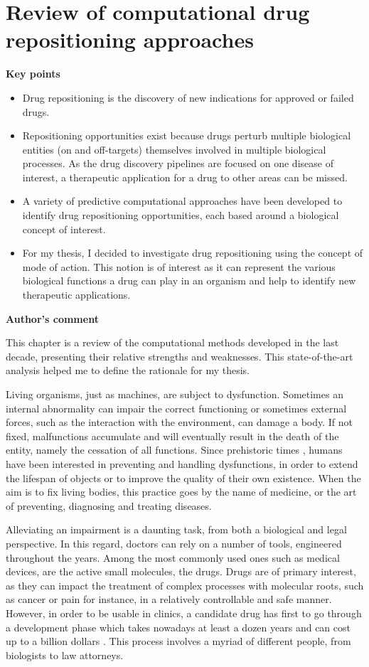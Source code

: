 \chapter{Review of computational drug repositioning approaches}

\textbf{Key points}
\begin{itemize}
  \item Drug repositioning is the discovery of new indications for approved or failed drugs.
  \item Repositioning opportunities exist because drugs perturb multiple biological entities (on and off-targets) themselves involved in multiple biological processes. As the drug discovery pipelines are focused on one disease of interest, a therapeutic application for a drug to other areas can be missed.
  \item A variety of predictive computational approaches have been developed to identify drug repositioning opportunities, each based around a biological concept of interest.
  \item For my thesis, I decided to investigate drug repositioning using the concept of mode of action. This notion is of interest as it can represent the various biological functions a drug can play in an organism and help to identify new therapeutic applications.
\end{itemize}

\textbf{Author’s comment}

This chapter is a review of the computational methods developed in the last decade, presenting their relative strengths and weaknesses. This state-of-the-art analysis helped me to define the rationale for my thesis.

Living organisms, just as machines, are subject to dysfunction. Sometimes an internal abnormality can impair the correct functioning or sometimes external forces, such as the interaction with the environment, can damage a body. If not fixed, malfunctions accumulate and will eventually result in the death of the entity, namely the cessation of all functions. Since prehistoric times \citep{prehistoricwiki}, humans have been interested in preventing and handling dysfunctions, in order to extend the lifespan of objects or to improve the quality of their own existence. When the aim is to fix living bodies, this practice goes by the name of medicine, or the art of preventing, diagnosing and treating diseases.

Alleviating an impairment is a daunting task, from both a biological and legal perspective. In this regard, doctors can rely on a number of tools, engineered throughout the years. Among the most commonly used ones such as medical devices, are the active small molecules, the drugs. Drugs are of primary interest, as they can impact the treatment of complex processes with molecular roots, such as cancer or pain for instance, in a relatively controllable and safe manner. However, in order to be usable in clinics, a candidate drug has first to go through a development phase which takes nowadays at least a dozen years and can cost up to a billion dollars \citep{dimasi2001new}. This process involves a myriad of different people, from biologists to law attorneys.

